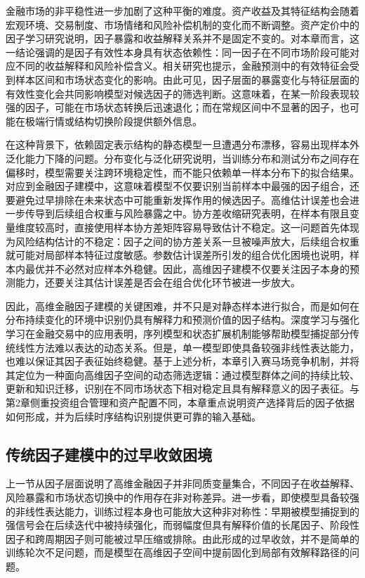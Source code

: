 金融市场的非平稳性进一步加剧了这种平衡的难度。资产收益及其特征结构会随着宏观环境、交易制度、市场情绪和风险补偿机制的变化而不断调整。资产定价中的因子学习研究说明，因子暴露和收益解释关系并不是固定不变的\cite{KELLY2019501}。对本章而言，这一结论强调的是因子有效性本身具有状态依赖性：同一因子在不同市场阶段可能对应不同的收益解释和风险补偿含义。相关研究也提示，金融预测中的有效特征会受到样本区间和市场状态变化的影响\cite{repec:fau:wpaper:wp2024_26}。由此可见，因子层面的暴露变化与特征层面的有效性变化会共同影响模型对候选因子的筛选判断。这意味着，在某一阶段表现较强的因子，可能在市场状态转换后迅速退化；而在常规区间中不显著的因子，也可能在极端行情或结构切换阶段提供额外信息。

在这种背景下，依赖固定表示结构的静态模型一旦遭遇分布漂移，容易出现样本外泛化能力下降的问题。分布变化与泛化研究说明，当训练分布和测试分布之间存在偏移时，模型需要关注跨环境稳定性，而不能只依赖单一样本分布下的拟合结果\cite{scholkopf2021toward}。对应到金融因子建模中，这意味着模型不仅要识别当前样本中最强的因子组合，还要避免过早排除在未来状态中可能重新发挥作用的候选因子。高维估计误差也会进一步传导到后续组合权重与风险暴露之中。协方差收缩研究表明，在样本有限且变量维度较高时，直接使用样本协方差矩阵容易导致估计不稳定\cite{ledoit2004honey}。这一问题首先体现为风险结构估计的不稳定：因子之间的协方差关系一旦被噪声放大，后续组合权重就可能对局部样本特征过度敏感。参数估计误差所引发的组合优化困境也说明，样本内最优并不必然对应样本外稳健\cite{michaud1989markowitz}。因此，高维因子建模不仅要关注因子本身的预测能力，还要关注其估计误差是否会在组合优化环节被进一步放大。

因此，高维金融因子建模的关键困难，并不只是对静态样本进行拟合，而是如何在分布持续变化的环境中识别仍具有解释力和预测价值的因子结构。深度学习与强化学习在金融交易中的应用表明，序列模型和状态扩展机制能够帮助模型捕捉部分传统线性方法难以表达的动态关系\cite{liu2022synthetic}。但是，单一模型即使具备较强非线性表达能力，也难以保证其因子表征始终稳健。基于上述分析，本章引入赛马场竞争机制，并将其定位为一种面向高维因子空间的动态筛选逻辑：通过模型群体之间的持续比较、更新和知识迁移，识别在不同市场状态下相对稳定且具有解释意义的因子表征。与第2章侧重投资组合管理和资产配置不同，本章重点说明资产选择背后的因子依据如何形成，并为后续时序结构识别提供更可靠的输入基础。

\subsection{传统因子建模中的过早收敛困境}
上一节从因子层面说明了高维金融因子并非同质变量集合，不同因子在收益解释、风险暴露和市场状态切换中的作用存在非对称差异。进一步看，即使模型具备较强的非线性表达能力，训练过程本身也可能放大这种非对称性：早期被模型捕捉到的强信号会在后续迭代中被持续强化，而弱幅度但具有解释价值的长尾因子、阶段性因子和跨周期因子则可能被过早压缩或排除。由此形成的过早收敛，并不是简单的训练轮次不足问题，而是模型在高维因子空间中提前固化到局部有效解释路径的问题。

